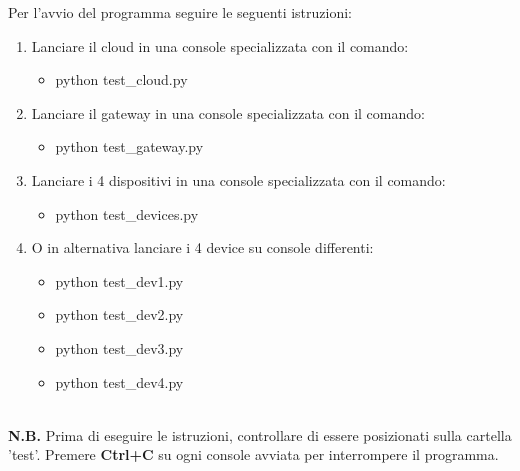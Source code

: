 \documentclass[a4paper,12pt]{report}
\begin{document}
Per l'avvio del programma seguire le seguenti istruzioni:
\begin{enumerate}
    \item Lanciare il cloud in una console specializzata con il comando:
    \begin{itemize}
        \item python test\_cloud.py
    \end{itemize}
    \item Lanciare il gateway in una console specializzata con il comando:
    \begin{itemize}
        \item python test\_gateway.py
    \end{itemize} 
    \item Lanciare i 4 dispositivi in una console specializzata con il comando:
    \begin{itemize}
        \item python test\_devices.py
    \end{itemize} 
    \item O in alternativa lanciare i 4 device su console differenti:
    \begin{itemize}
        \item python test\_dev1.py
        \item python test\_dev2.py
        \item python test\_dev3.py
        \item python test\_dev4.py
    \end{itemize}
\end{enumerate}
\\
\textbf{N.B.} Prima di eseguire le istruzioni, controllare di essere posizionati sulla cartella 'test'.
%
\newline
\newline
Premere \textbf{Ctrl+C} su ogni console avviata per interrompere il programma.
\end{document}
